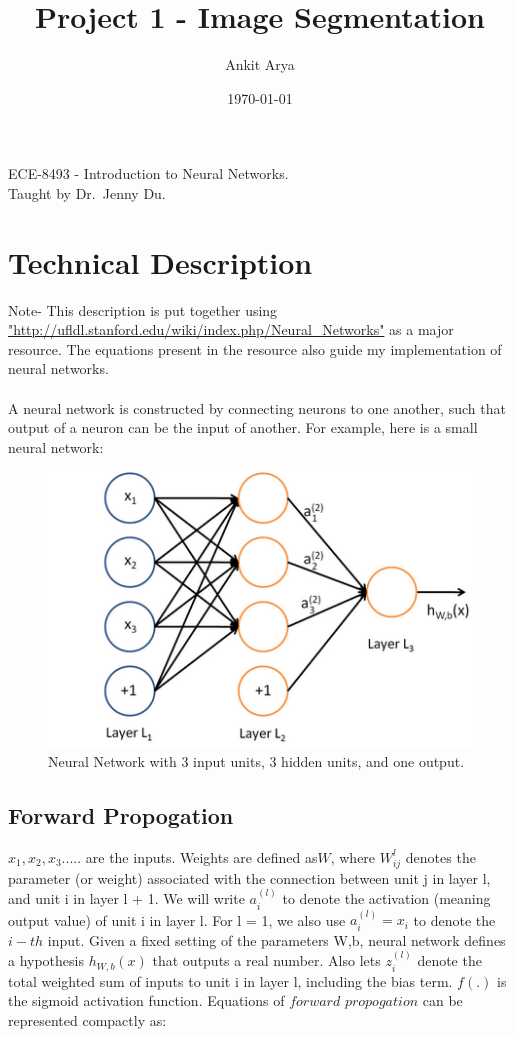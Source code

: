 \documentclass[a4paper, 12pt]{article}
\title{Project 1 - Image Segmentation} %
\author{Ankit Arya} %
\date{\today} %
\begin{document}
\maketitle
\begin{center}
ECE-8493 - Introduction to Neural Networks. %
\\[12pt]
Taught by Dr.\ Jenny Du. %
\end{center}
\thispagestyle{empty}



\newpage
\section{Technical Description}
%

Note-  This description is put together using \url{"http://ufldl.stanford.edu/wiki/index.php/Neural_Networks"} as a major resource. The equations present in the resource also guide my implementation of neural networks.
\\~\\

A neural network is constructed by connecting neurons to one another, such that output of a neuron can be the input of another. For example, here is a small neural network:

\begin{figure}[H]
\includegraphics[scale=0.5]{nNetwork}
\caption{Neural Network with 3 input units, 3 hidden units, and one output.}
\end{figure}


\subsection{Forward Propogation}
$x_1,x_2,x_3.....$ are the inputs. 
Weights are defined as$W$, where $W^l_{ij} $ denotes the parameter (or weight) associated with the connection between unit j in layer l, and unit i in layer l + 1. We will write $a^{(l)}_i $ to denote the activation (meaning output value) of unit i in layer l. For l = 1, we also use $a^{(l)}_i = x_i$   to denote the $i-th$ input. Given a fixed setting of the parameters W,b, neural network defines a hypothesis $h_{W,b}(x)$ that outputs a real number.
 Also lets $z^{(l)}_i $  denote the total weighted sum of inputs to unit i in layer l, including the bias term. $f(.)$ is the sigmoid activation function.
Equations of $forward$ $propogation$ can be represented compactly as:
\end{document}
